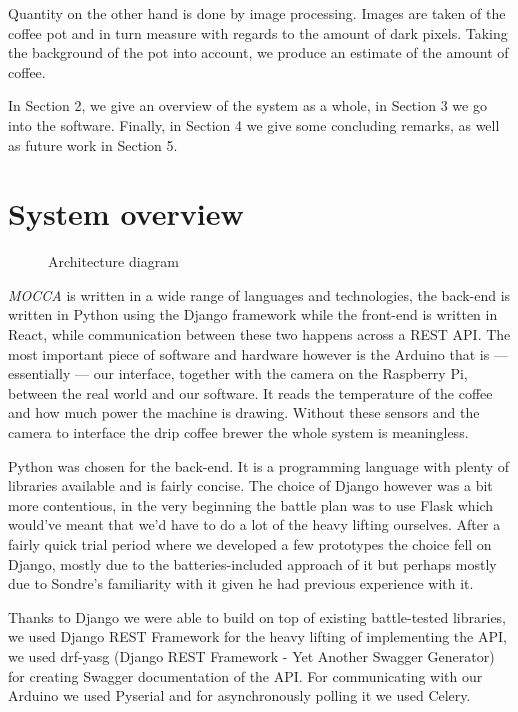 \documentclass[12pt,a4paper,oneside,article]{memoir}
\numberwithin{equation}{chapter}
\begin{document}
Quantity on the other hand is done by image processing. Images are taken of the
coffee pot and in turn measure with regards to the amount of dark pixels.
Taking the background of the pot into account, we produce an estimate of
the amount of coffee.

In Section 2, we give an overview of the system as a whole, in Section 3 we go 
into the software. Finally, in Section 4 we give some concluding remarks, as 
well as future work in Section 5.


\section{System overview}\label{sec:technical-details}
\begin{figure}[h]
  \centering
  \scalebox{.75}{}
  \caption{Architecture diagram}\label{fig:architecture}
\end{figure}
\textit{MOCCA} is written in a wide range of languages and technologies, the
back-end is written in Python using the Django framework while the front-end is
written in React, while communication between these two happens across a REST
API.
The most important piece of software and hardware however is the Arduino
that is --- essentially --- our interface, together with the camera on the 
Raspberry Pi, between the real world and our software. It reads the temperature 
of the coffee and how much power the machine is drawing. Without these sensors 
and the camera to interface the drip coffee brewer the whole system is 
meaningless. 

Python was chosen for the back-end. It is a programming language with plenty of 
libraries available and is fairly concise. The choice of Django however was a 
bit more contentious, in the very beginning the battle plan was to use Flask 
which would've meant that we'd have to do a lot of the heavy lifting ourselves.
After a fairly quick trial period where we developed a few prototypes the choice
fell on Django, mostly due to the batteries-included approach of it but perhaps
mostly due to Sondre's familiarity with it given he had previous experience with
it.

Thanks to Django we were able to build on top of existing battle-tested
libraries, we used Django REST Framework for the heavy lifting of implementing
the API, we used drf-yasg (Django REST Framework - Yet Another Swagger
Generator) for creating Swagger documentation of the API. For communicating with
our Arduino we used Pyserial and for asynchronously polling it we used Celery.
\end{document}
